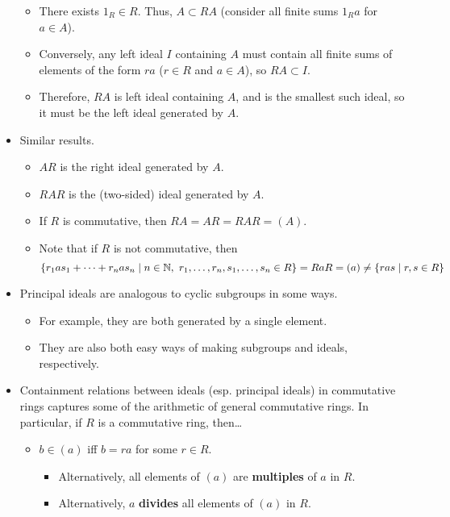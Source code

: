 \documentclass[../notes.tex]{subfiles}
\begin{document}
\begin{itemize}
\begin{itemize}
        \item There exists $1_R\in R$. Thus, $A\subset RA$ (consider all finite sums $1_Ra$ for $a\in A$).
        \item Conversely, any left ideal $I$ containing $A$ must contain all finite sums of elements of the form $ra$ ($r\in R$ and $a\in A$), so $RA\subset I$.
        \item Therefore, $RA$ is left ideal containing $A$, and is the smallest such ideal, so it must be the left ideal generated by $A$.
    \end{itemize}
    \item Similar results.
    \begin{itemize}
        \item $AR$ is the right ideal generated by $A$.
        \item $RAR$ is the (two-sided) ideal generated by $A$.
        \item If $R$ is commutative, then $RA=AR=RAR=(A)$.
        \item {}Note that if $R$ is not commutative, then
        \begin{equation*}
            \{r_1as_1+\cdots+r_nas_n\mid n\in\N,\ r_1,\dots,r_n,s_1,\dots,s_n\in R\} = RaR = (a) \neq \{ras\mid r,s\in R\}
        \end{equation*}
    \end{itemize}
    \item Principal ideals are analogous to cyclic subgroups in some ways.
    \begin{itemize}
        \item For example, they are both generated by a single element.
        \item They are also both easy ways of making subgroups and ideals, respectively.
    \end{itemize}
    \item Containment relations between ideals (esp. principal ideals) in commutative rings captures some of the arithmetic of general commutative rings. In particular, if $R$ is a commutative ring, then\dots
    \begin{itemize}
        \item $b\in(a)$ iff $b=ra$ for some $r\in R$.
        \begin{itemize}
            \item Alternatively, all elements of $(a)$ are \textbf{multiples} of $a$ in $R$.
            \item Alternatively, $a$ \textbf{divides} all elements of $(a)$ in $R$.

\end{itemize}
\end{itemize}
\end{itemize}
\end{document}
